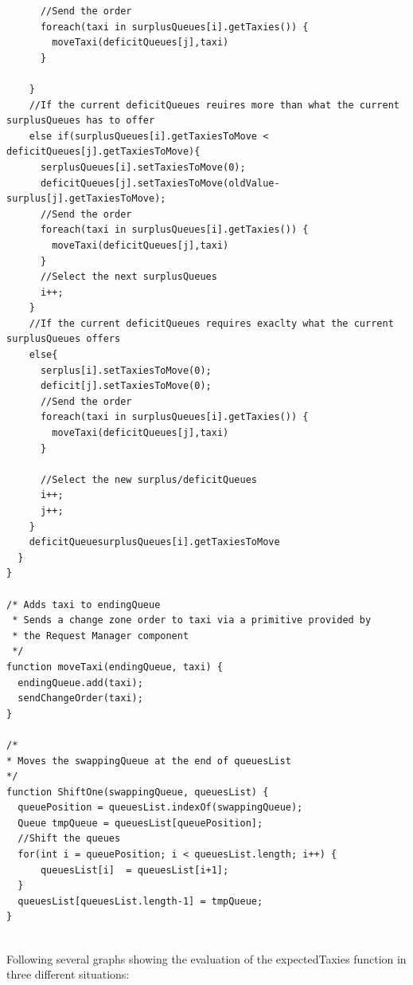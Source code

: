 \documentclass[11pt,titlepage]{article} %
\begin{document}
\begin{lstlisting}
      //Send the order
      foreach(taxi in surplusQueues[i].getTaxies()) {
        moveTaxi(deficitQueues[j],taxi)
      }

    }
    //If the current deficitQueues reuires more than what the current surplusQueues has to offer
    else if(surplusQueues[i].getTaxiesToMove < deficitQueues[j].getTaxiesToMove){
      serplusQueues[i].setTaxiesToMove(0);
      deficitQueues[j].setTaxiesToMove(oldValue-surplus[j].getTaxiesToMove);
      //Send the order
      foreach(taxi in surplusQueues[i].getTaxies()) {
        moveTaxi(deficitQueues[j],taxi)
      }
      //Select the next surplusQueues
      i++;
    }
    //If the current deficitQueues requires exaclty what the current surplusQueues offers
    else{
      serplus[i].setTaxiesToMove(0);
      deficit[j].setTaxiesToMove(0);
      //Send the order
      foreach(taxi in surplusQueues[i].getTaxies()) {
        moveTaxi(deficitQueues[j],taxi)
      }

      //Select the new surplus/deficitQueues
      i++;
      j++;
    }
    deficitQueuesurplusQueues[i].getTaxiesToMove
  }
}

/* Adds taxi to endingQueue
 * Sends a change zone order to taxi via a primitive provided by
 * the Request Manager component
 */
function moveTaxi(endingQueue, taxi) {
  endingQueue.add(taxi);
  sendChangeOrder(taxi);
}

/*
* Moves the swappingQueue at the end of queuesList
*/
function ShiftOne(swappingQueue, queuesList) {
  queuePosition = queuesList.indexOf(swappingQueue);
  Queue tmpQueue = queuesList[queuePosition];
  //Shift the queues
  for(int i = queuePosition; i < queuesList.length; i++) {
      queuesList[i]  = queuesList[i+1];
  }
  queuesList[queuesList.length-1] = tmpQueue;
}


\end{lstlisting}
Following several graphs showing the evaluation of the expectedTaxies function in three different situations:\newline
\end{document}
